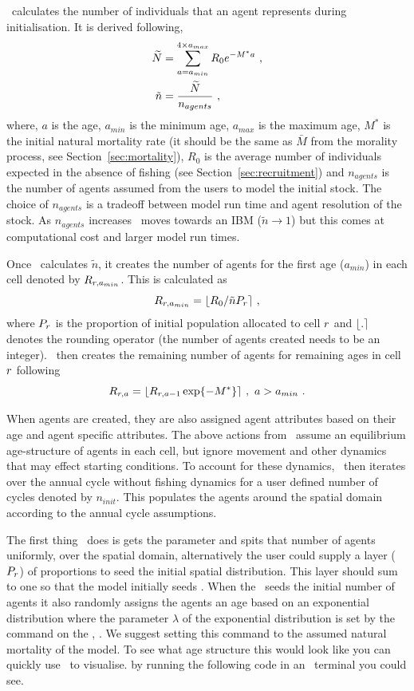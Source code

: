 \IBM\ calculates the number of individuals that an agent represents during initialisation. It is derived following,
\begin{align*}
\widetilde{N} &= \sum\limits_{a = a_{min}}^{4\times a_{max}} R_0 e^{-M^* a} \label{eq:abm:init} \ ,\\
\tilde{n} &= \frac{\widetilde{N}}{n_{agents}} \ , 
\end{align*}
where, \(a\) is the age, \(a_{min}\) is the minimum age, \(a_{max}\) is the maximum age, \(M^*\) is the initial natural mortality rate (it should be the same as \(\bar{M}\) from the morality process, see Section~\ref{sec:mortality}), \(R_0\) is the average number of individuals expected in the absence of fishing  (see Section~\ref{sec:recruitment}) and \(n_{agents}\) is the number of agents assumed from the users to model the initial stock. The choice of \(n_{agents}\) is a tradeoff between model run time and agent resolution of the stock. As \(n_{agents}\) increases \IBM\ moves towards an IBM (\(\tilde{n} \rightarrow 1\)) but this comes at computational cost and larger model run times.


Once  \IBM\ calculates \(\tilde{n}\), it creates the number of agents for the first age (\(a_{min}\)) in each cell denoted by \(R_{r,a_{min}}\). This is calculated as
\[
R_{r,a_{min}} = \lfloor R_0/\tilde{n} P_{r} \rceil  \ ,
\]
where \(P_{r}\) is the proportion of initial population allocated to cell \(r\) and \(\lfloor . \rceil\) denotes the rounding operator (the number of agents created needs to be an integer). \IBM\ then creates the remaining number of agents for remaining ages in cell \(r\) following
\[
R_{r,a} =\lfloor R_{r,a - 1} \exp \{-{M^*}\} \rceil \ , \ a > a_{min} \ .
\]

When agents are created, they are also assigned agent attributes based on their age and agent specific attributes. The above actions from \IBM\ assume an equilibrium age-structure of agents in each cell, but ignore movement and other dynamics that may effect starting conditions. To account for these dynamics, \IBM\ then iterates over the annual cycle without fishing dynamics for a user defined number of cycles denoted by \(n_{init}\). This populates the agents around the spatial domain according to the annual cycle assumptions.


The first thing \IBM\ does is gets the parameter  and spits that number of agents uniformly, over the spatial domain, alternatively the user could supply a layer  (\(P_{r}\)) of proportions to seed the initial spatial distribution. This layer should sum to one so that the model initially seeds . When the \IBM\ seeds the initial number of agents it also randomly assigns the agents an age based on an exponential distribution where the parameter $\lambda$ of the exponential distribution is set by the command on the , . We suggest setting this command to the assumed natural mortality of the model. To see what age structure this would look like you can quickly use \R\ to visualise. by running the following code in an \R\ terminal you could see.

